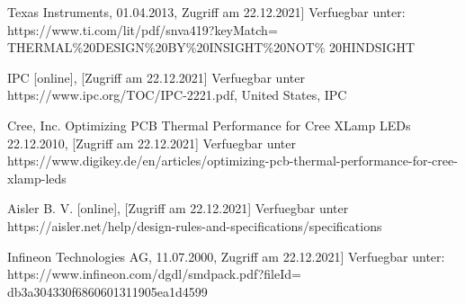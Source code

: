 \documentclass[10pt,a4paper,oneside,abstracton]{scrartcl}
\begin{document}
\begin{multicols}{2}
\begin{thebibliography}{9}
Texas Instruments, 01.04.2013, Zugriff am 22.12.2021] Verfuegbar unter: https://www.ti.com/lit/pdf/snva419?keyMatch=
THERMAL\%20DESIGN\%20BY\%20INSIGHT\%20NOT\%
20HINDSIGHT

IPC  [online], [Zugriff am 22.12.2021] Verfuegbar unter https://www.ipc.org/TOC/IPC-2221.pdf, United States, IPC

Cree, Inc. Optimizing PCB Thermal Performance for Cree XLamp LEDs 22.12.2010, [Zugriff am 22.12.2021] Verfuegbar unter https://www.digikey.de/en/articles/optimizing-pcb-thermal-performance-for-cree-xlamp-leds

Aisler B. V.  [online], [Zugriff am 22.12.2021] Verfuegbar unter https://aisler.net/help/design-rules-and-specifications/specifications

Infineon Technologies AG, 11.07.2000, Zugriff am 22.12.2021] Verfuegbar unter: https://www.infineon.com/dgdl/smdpack.pdf?fileId=
db3a304330f6860601311905ea1d4599


\end{thebibliography}

\end{multicols}
 
\end{document}
